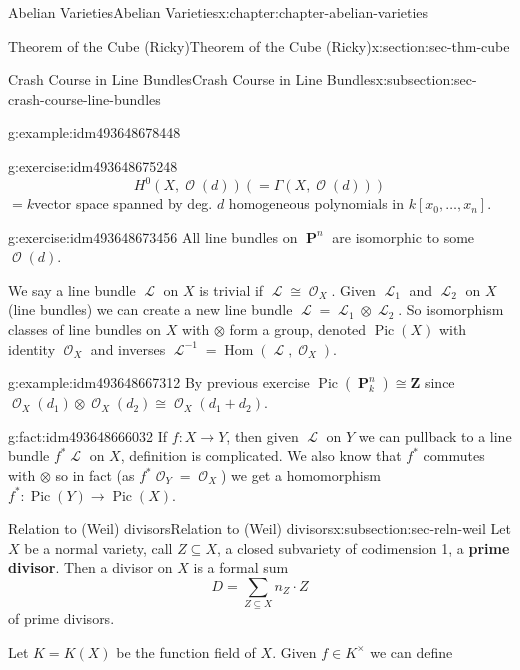 \documentclass[oneside,10pt,]{book}
\newcommand{\terminology}[1]{\textbf{#1}}
\numberwithin{equation}{section}
\newcommand{\sheaf}[1]{\operatorname{\mathcal{#1}}}
\newcommand{\ZZ}{\mathbf{Z}}
\DeclareMathOperator{\Hom}{Hom}
\DeclareMathOperator{\Pic}{Pic}
\DeclareMathOperator{\PP}{\mathbf{P}}
\begin{document}
\begin{chapterptx}{Abelian Varieties}{}{Abelian Varieties}{}{}{x:chapter:chapter-abelian-varieties}
\begin{sectionptx}{Theorem of the Cube (Ricky)}{}{Theorem of the Cube (Ricky)}{}{}{x:section:sec-thm-cube}
\begin{subsectionptx}{Crash Course in Line Bundles}{}{Crash Course in Line Bundles}{}{}{x:subsection:sec-crash-course-line-bundles}
\begin{example}{}{g:example:idm493648678448}
\end{example}
\begin{inlineexercise}{}{g:exercise:idm493648675248}%
%
\begin{equation*}
H^0(X,\sheaf O(d)) ( = \Gamma (X,\sheaf O(d)))
\end{equation*}
\(= k\)vector space spanned by deg. \(d\) homogeneous polynomials in \(k[x_0,\ldots, x_n]\).%
\end{inlineexercise}
\begin{inlineexercise}{}{g:exercise:idm493648673456}%
All line bundles on \(\PP^n\) are isomorphic to some \(\sheaf O(d)\).%
\end{inlineexercise}
We say a line bundle \(\sheaf L\) on \(X\) is trivial if \(\sheaf L \cong \sheaf O_X\). Given \(\sheaf L_1\) and \(\sheaf L_2\) on \(X\) (line bundles) we can create a new line bundle \(\sheaf L = \sheaf L_1 \otimes \sheaf L_2\). So isomorphism classes of line bundles on \(X\) with \(\otimes\) form a group, denoted \(\Pic(X)\) with identity \(\sheaf O_X\) and inverses \(\sheaf L^{-1} = \Hom(\sheaf L , \sheaf O_X)\).%
\begin{example}{}{g:example:idm493648667312}%
By previous exercise \(\Pic(\PP_k^n) \cong \ZZ\) since \(\sheaf O_X(d_1) \otimes \sheaf O_X(d_2)  \cong \sheaf O_X(d_1+d_2)\).%
\end{example}
\begin{fact}{}{}{g:fact:idm493648666032}%
If \(f\colon X \to Y\), then given \(\sheaf L\) on \(Y\) we can pullback to a line bundle \(f^* \sheaf L\) on \(X\), definition is complicated. We also know that \(f^*\) commutes with \(\otimes\) so in fact (as \(f^*\sheaf O_Y = \sheaf O_X\)) we get a homomorphism \(f^* \colon \Pic(Y) \to \Pic(X)\).%
\end{fact}
\end{subsectionptx}
%
%
\typeout{************************************************}
\typeout{************************************************}
%
\begin{subsectionptx}{Relation to (Weil) divisors}{}{Relation to (Weil) divisors}{}{}{x:subsection:sec-reln-weil}
Let \(X\) be a normal variety, call \(Z\subseteq X\), a closed subvariety of codimension 1, a \terminology{prime divisor}. Then a divisor on \(X\) is a formal sum%
\begin{equation*}
D = \sum_{Z\subseteq X} n_Z\cdot Z
\end{equation*}
of prime divisors.%
\par
Let \(K = K(X)\) be the function field of \(X\). Given \(f\in K^\times\) we can define%

\end{subsectionptx}
\end{sectionptx}
\end{chapterptx}
\end{document}
